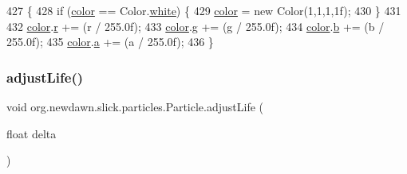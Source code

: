 \begin{DoxyCode}
427                                                         \{
428         \textcolor{keywordflow}{if} (\mbox{\hyperlink{classorg_1_1newdawn_1_1slick_1_1particles_1_1_particle_a2467718786828ecca08ea7f4bfd1c47d}{color}} == Color.\mbox{\hyperlink{classorg_1_1newdawn_1_1slick_1_1_color_afcd91cbdd26233d226d734f70dca3d2e}{white}}) \{
429             \mbox{\hyperlink{classorg_1_1newdawn_1_1slick_1_1particles_1_1_particle_a2467718786828ecca08ea7f4bfd1c47d}{color}} = \textcolor{keyword}{new} Color(1,1,1,1f);
430         \} 
431         
432         \mbox{\hyperlink{classorg_1_1newdawn_1_1slick_1_1particles_1_1_particle_a2467718786828ecca08ea7f4bfd1c47d}{color}}.\mbox{\hyperlink{classorg_1_1newdawn_1_1slick_1_1_color_ac07fa95108064b044dcf9a53e95dcb48}{r}} += (r / 255.0f);
433         \mbox{\hyperlink{classorg_1_1newdawn_1_1slick_1_1particles_1_1_particle_a2467718786828ecca08ea7f4bfd1c47d}{color}}.\mbox{\hyperlink{classorg_1_1newdawn_1_1slick_1_1_color_aa6ebff7c102a1476e7b511a78397b753}{g}} += (g / 255.0f);
434         \mbox{\hyperlink{classorg_1_1newdawn_1_1slick_1_1particles_1_1_particle_a2467718786828ecca08ea7f4bfd1c47d}{color}}.\mbox{\hyperlink{classorg_1_1newdawn_1_1slick_1_1_color_a8c0cef152e16438fee852a97e50ef7a5}{b}} += (b / 255.0f);
435         \mbox{\hyperlink{classorg_1_1newdawn_1_1slick_1_1particles_1_1_particle_a2467718786828ecca08ea7f4bfd1c47d}{color}}.\mbox{\hyperlink{classorg_1_1newdawn_1_1slick_1_1_color_ab9288c822ff7614a77c887eb8c2595a7}{a}} += (a / 255.0f);
436     \}
\end{DoxyCode}
\mbox{\label{classorg_1_1newdawn_1_1slick_1_1particles_1_1_particle_a3a137a2701a6047cebf8324920cfc689}} 
\subsubsection{\texorpdfstring{adjust\+Life()}{adjustLife()}}
{\footnotesize\ttfamily void org.\+newdawn.\+slick.\+particles.\+Particle.\+adjust\+Life (\begin{DoxyParamCaption}\item[{float}]{delta }\end{DoxyParamCaption})\hspace{0.3cm}{\ttfamily [inline]}}

